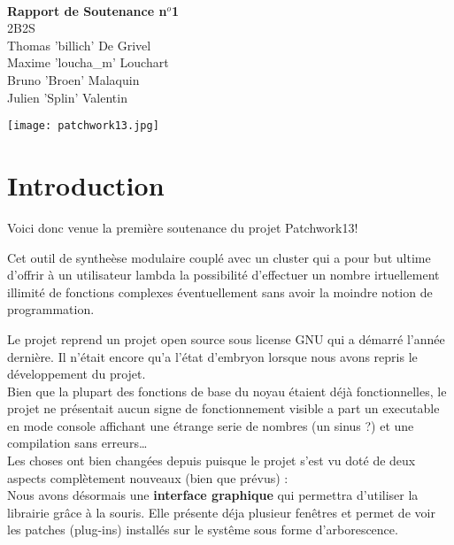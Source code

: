\documentclass[14pt,a4paper]{report}
\begin{document}
\begin{center}
\rule{0cm}{19mm} \\

{\Huge \textbf{Rapport de Soutenance n$^o$1}} \\[23mm]

{\huge 2B2S} \\[8mm]

Thomas 'billich' De Grivel \\
Maxime 'loucha\_m' Louchart \\
Bruno 'Broen' Malaquin \\
Julien 'Splin' Valentin \\[32mm]

\centerline{{\texttt{[image: patchwork13.jpg]}}}

\end{center}

\newpage

\tableofcontents

\newpage



\chapter{Introduction}

Voici donc venue la premi\`ere soutenance du projet Patchwork13!

Cet outil de synthe\`ese modulaire coupl\'e avec un cluster qui a pour
but ultime d'offrir \`a un utilisateur lambda la possibilit\'e d'effectuer
un nombre irtuellement illimit\'e de fonctions complexes
\'eventuellement sans avoir
la moindre notion de programmation.

Le projet reprend un projet open source sous license GNU qui a
d\'emarr\'e l'ann\'ee derni\`ere. Il n'\'etait encore qu'a
l'\'etat d'embryon lorsque nous avons repris le d\'eveloppement
du projet. \\

Bien que la plupart des fonctions de base du noyau \'etaient
d\'ej\`a fonctionnelles, le projet ne pr\'esentait aucun
signe de fonctionnement visible a part
un executable en mode console affichant une \'etrange serie de
nombres (un sinus ?) et une compilation sans erreurs\ldots \\

Les choses ont bien chang\'ees depuis puisque le projet s'est
vu dot\'e de deux aspects compl\`etement nouveaux
(bien que pr\'evus) : \\

Nous avons d\'esormais une {\bf interface graphique} qui permettra d'utiliser
la librairie gr\^ace \`a la souris. Elle pr\'esente d\'eja plusieur
fen\^etres et permet de voir les patches (plug-ins) install\'es sur
le syst\^eme sous forme d'arborescence. \\
\end{document}
